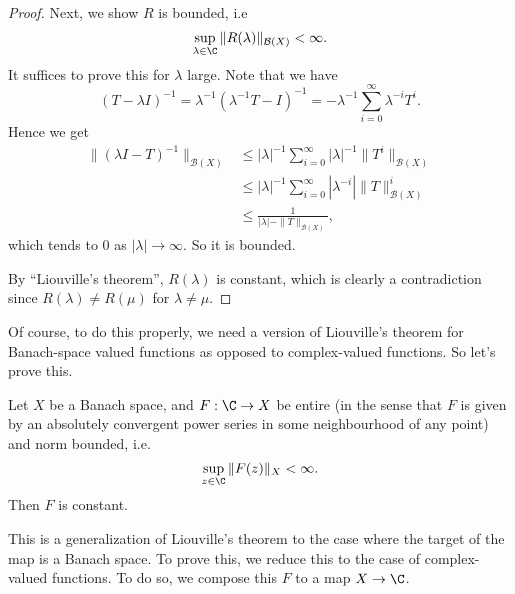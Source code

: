 \documentclass[a4paper]{article}
\begin{document}
\begin{proof}
  Next, we show $R$ is bounded, i.e
  \[
    \sup_{\lambda \in \C} \|R (\lambda)\|_{\mathcal{B}(X)} < \infty.
  \]
  It suffices to prove this for $\lambda$ large. Note that we have
  \[
    (T - \lambda I)^{-1} = \lambda^{-1}(\lambda^{-1} T - I)^{-1} = -\lambda^{-1} \sum_{i = 0}^\infty \lambda^{-i} T^i.
  \]
  Hence we get
  \begin{align*}
    \|(\lambda I - T)^{-1}\|_{\mathcal{B}(X)} &\leq |\lambda|^{-1}\sum_{i = 0}^\infty |\lambda|^{-1} \|T^i\|_{\mathcal{B}(X)}\\
    &\leq |\lambda|^{-1} \sum_{i = 0}^\infty |\lambda^{-i}| \|T\|^i_{\mathcal{B}(X)}\\
    &\leq \frac{1}{|\lambda| - \|T\|_{\mathcal{B}(X)}},
  \end{align*}
  which tends to $0$ as $|\lambda| \to \infty$. So it is bounded.

  By ``Liouville's theorem'', $R(\lambda)$ is constant, which is clearly a contradiction since $R(\lambda) \not= R(\mu)$ for $\lambda \not= \mu$.
\end{proof}
Of course, to do this properly, we need a version of Liouville's theorem for Banach-space valued functions as opposed to complex-valued functions. So let's prove this.

\begin{prop}
  Let $X$ be a Banach space, and $F: \C \to X$ be entire (in the sense that $F$ is given by an absolutely convergent power series in some neighbourhood of any point) and norm bounded, i.e.
  \[
    \sup_{z \in \C} \|F(z)\|_X < \infty.
  \]
  Then $F$ is constant.
\end{prop}
This is a generalization of Liouville's theorem to the case where the target of the map is a Banach space. To prove this, we reduce this to the case of complex-valued functions. To do so, we compose this $F$ to a map $X \to \C$.
\end{document}
